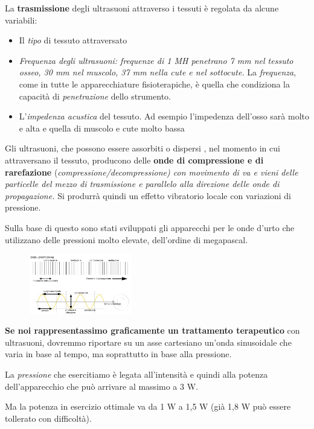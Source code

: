 La \textbf{trasmissione} degli ultrasuoni attraverso i tessuti è
regolata da alcune variabili:

\begin{itemize}
\item
  Il \emph{tipo} di tessuto attraversato
\item
  \emph{\emph{Frequenza degli ultrasuoni: frequenze di 1 MH penetrano 7
  mm nel tessuto osseo, 30 mm nel muscolo, 37 mm nella cute e nel
  sottocute.}} La \emph{frequenza}, come in tutte le apparecchiature
  fisioterapiche, è quella che condiziona la capacità di
  \emph{penetrazione} dello strumento.
\item
  L'\emph{impedenza acustica} del tessuto. Ad esempio l'impedenza
  dell'osso sarà molto e alta e quella di muscolo e cute molto bassa
\end{itemize}

Gli ultrasuoni, che possono essere assorbiti o dispersi , nel momento in
cui attraversano il tessuto, producono delle \textbf{onde di
compressione e di rarefazione} (\emph{compressione/decompressione) con
movimento di va e vieni delle particelle del mezzo di trasmissione e
parallelo alla direzione delle onde di propagazione.} Si produrrà quindi
un effetto vibratorio locale con variazioni di pressione.

Sulla base di questo sono stati sviluppati gli apparecchi per le onde
d'urto che utilizzano delle pressioni molto elevate, dell'ordine di
megapascal.

\begin{figure}[!ht]
\centering
\includegraphics[width=0.4\textwidth]{024/image1.jpeg}
\end{figure}

\textbf{Se
noi rappresentassimo graficamente un trattamento terapeutico} con
ultrasuoni, dovremmo riportare su un asse cartesiano un'onda sinusoidale
che varia in base al tempo, ma soprattutto in base alla pressione.

La \emph{pressione} che esercitiamo è legata all'intensità e quindi alla
potenza dell'apparecchio che può arrivare al massimo a 3 W.

Ma la potenza in esercizio ottimale va da 1 W a 1,5 W (già 1,8 W può
essere tollerato con difficoltà).

